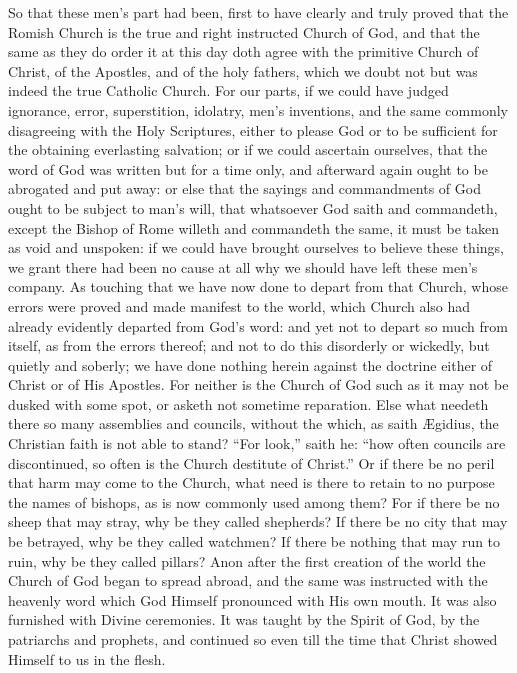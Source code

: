 So that these men’s part had been, first to have clearly and
truly proved that the Romish Church is the true and right instructed
Church of God, and that the same as they do order it at this day doth
agree with the primitive Church of Christ, of the Apostles, and of the
holy fathers, which we doubt not but was indeed the true Catholic Church.
For our parts, if we could have judged ignorance, error, superstition,
idolatry, men’s inventions, and the same commonly disagreeing
with the Holy Scriptures, either to please God or to be sufficient for
the obtaining everlasting salvation; or if we could ascertain ourselves,
that the word of God was written but for a time only, and afterward
again ought to be abrogated and put away: or else that the sayings and
commandments of God ought to be subject to man’s will, that whatsoever
God saith and commandeth, except the Bishop of Rome willeth and commandeth
the same, it must be taken as void and unspoken: if we could have brought
ourselves to believe these things, we grant there had been no cause
at all why we should have left these men’s company. As touching
that we have now done to depart from that Church, whose errors were
proved and made manifest to the world, which Church
also had already evidently departed from God’s word: and yet not
to depart so much from itself, as from the errors thereof; and not to
do this disorderly or wickedly, but quietly and soberly; we have done
nothing herein against the doctrine either of Christ or of His Apostles.
For neither is the Church of God such as it may not be dusked with some
spot, or asketh not sometime reparation. Else what needeth there
so many assemblies and councils, without the which, as saith Ægidius,
the Christian faith is not able to stand? “For look,”
saith he: “how often councils are discontinued, so often is the
Church destitute of Christ.” Or if there be no peril that
harm may come to the Church, what need is there to retain to no purpose
the names of bishops, as is now commonly used among them? For
if there be no sheep that may stray, why be they called shepherds?
If there be no city that may be betrayed, why be they called watchmen?
If there be nothing that may run to ruin, why be they called pillars?
Anon after the first creation of the world the Church of God began to
spread abroad, and the same was instructed with the heavenly word which
God Himself pronounced with His own mouth. It was also furnished
with Divine ceremonies. It was taught by the Spirit of God, by
the patriarchs and prophets,
and continued so even till the time that Christ showed Himself to us
in the flesh.

